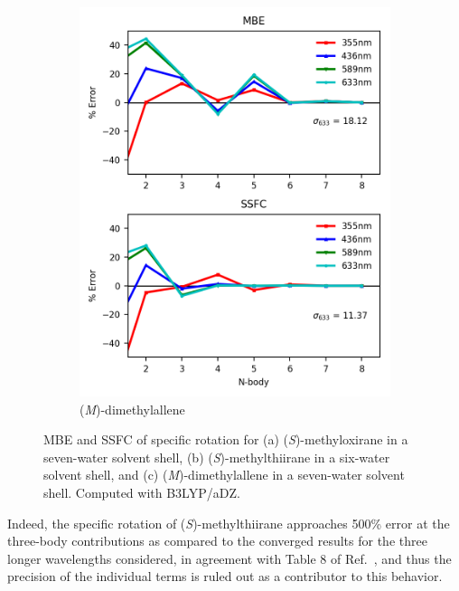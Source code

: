 \begin{figure}
\begin{subfigure}{0.5\textwidth}
                \includegraphics[scale=0.75]{p1/graphs/dma_7_b3_rot.png}
                \caption{(\textit{M})-dimethylallene}
                \label{dma_7_rot}
            \end{subfigure}
            \caption{MBE and SSFC of specific rotation for (a) (\textit{S})-methyloxirane in a seven-water solvent shell, (b) (\textit{S})-methylthiirane in a six-water solvent shell, and (c) (\textit{M})-dimethylallene in a seven-water solvent shell. Computed with B3LYP/aDZ.}
            \label{metox_metthi_rot}
        \end{figure}
        Indeed, the specific rotation of (\textit{S})-methylthiirane approaches 500\% error at the three-body contributions as compared to the converged results for the three longer wavelengths considered, in agreement with Table 8 of Ref.~, and thus the precision of the individual terms is ruled out as a contributor to this behavior.

